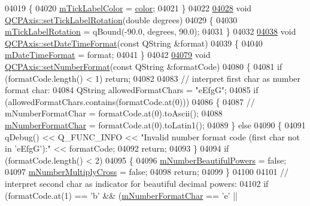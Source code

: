 \begin{DoxyCode}
04019 \{
04020   \hyperlink{a00025_a6384a749b3b56a97df081d8082321ab4}{mTickLabelColor} = \hyperlink{a00116_ae35093fbf4f645dcefd930ca8c68b622}{color};
04021 \}
04022 
\hypertarget{a00115_source_l04028}{}\hyperlink{a00025_a1bddd4413df8a576b7ad4b067fb33375}{04028} \textcolor{keywordtype}{void} \hyperlink{a00025_a1bddd4413df8a576b7ad4b067fb33375}{QCPAxis::setTickLabelRotation}(\textcolor{keywordtype}{double} degrees)
04029 \{
04030   \hyperlink{a00025_a47660c8694884cdb87495bf8b4c8a3b9}{mTickLabelRotation} = qBound(-90.0, degrees, 90.0);
04031 \}
04032 
\hypertarget{a00115_source_l04038}{}\hyperlink{a00025_a2ee0191daa03524a682113e63e05f7a7}{04038} \textcolor{keywordtype}{void} \hyperlink{a00025_a2ee0191daa03524a682113e63e05f7a7}{QCPAxis::setDateTimeFormat}(\textcolor{keyword}{const} QString &format)
04039 \{
04040   \hyperlink{a00025_a0b7ad83550d71daab4cfee2918e168e0}{mDateTimeFormat} = format;
04041 \}
04042 
\hypertarget{a00115_source_l04079}{}\hyperlink{a00025_ae585a54dc2aac662e90a2ca82f002590}{04079} \textcolor{keywordtype}{void} \hyperlink{a00025_ae585a54dc2aac662e90a2ca82f002590}{QCPAxis::setNumberFormat}(\textcolor{keyword}{const} QString &formatCode)
04080 \{
04081   \textcolor{keywordflow}{if} (formatCode.length() < 1) \textcolor{keywordflow}{return};
04082   
04083   \textcolor{comment}{// interpret first char as number format char:}
04084   QString allowedFormatChars = \textcolor{stringliteral}{"eEfgG"};
04085   \textcolor{keywordflow}{if} (allowedFormatChars.contains(formatCode.at(0)))
04086   \{
04087   \textcolor{comment}{// mNumberFormatChar = formatCode.at(0).toAscii();}
04088     \hyperlink{a00025_a600d56365316ea783927f7d595f1ed54}{mNumberFormatChar} = formatCode.at(0).toLatin1();
04089   \} \textcolor{keywordflow}{else}
04090   \{
04091     qDebug() << Q\_FUNC\_INFO << \textcolor{stringliteral}{"Invalid number format code (first char not in 'eEfgG'):"} << formatCode;
04092     \textcolor{keywordflow}{return};
04093   \}
04094   \textcolor{keywordflow}{if} (formatCode.length() < 2)
04095   \{
04096     \hyperlink{a00025_af03809bee3f3e35fcc38d25b6dd5003b}{mNumberBeautifulPowers} = \textcolor{keyword}{false};
04097     \hyperlink{a00025_aebf0367d8645d2e05b93a0952b7e805b}{mNumberMultiplyCross} = \textcolor{keyword}{false};
04098     \textcolor{keywordflow}{return};
04099   \}
04100   
04101   \textcolor{comment}{// interpret second char as indicator for beautiful decimal powers:}
04102   \textcolor{keywordflow}{if} (formatCode.at(1) == \textcolor{charliteral}{'b'} && (\hyperlink{a00025_a600d56365316ea783927f7d595f1ed54}{mNumberFormatChar} == \textcolor{charliteral}{'e'} || 

\end{DoxyCode}
